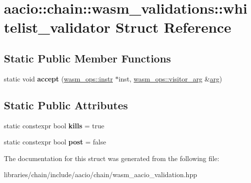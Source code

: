 \hypertarget{structaacio_1_1chain_1_1wasm__validations_1_1whitelist__validator}{}\section{aacio\+:\+:chain\+:\+:wasm\+\_\+validations\+:\+:whitelist\+\_\+validator Struct Reference}
\label{structaacio_1_1chain_1_1wasm__validations_1_1whitelist__validator}
\subsection*{Static Public Member Functions}
\begin{DoxyCompactItemize}
\item 
\mbox{\label{structaacio_1_1chain_1_1wasm__validations_1_1whitelist__validator_a9bad0a2b82ad8829cca69389fc95f2da}} 
static void {\bfseries accept} (\mbox{\hyperlink{structaacio_1_1chain_1_1wasm__ops_1_1instr}{wasm\+\_\+ops\+::instr}} $\ast$inst, \mbox{\hyperlink{structaacio_1_1chain_1_1wasm__ops_1_1visitor__arg}{wasm\+\_\+ops\+::visitor\+\_\+arg}} \&\mbox{\hyperlink{unionarg}{arg}})
\end{DoxyCompactItemize}
\subsection*{Static Public Attributes}
\begin{DoxyCompactItemize}
\item 
\mbox{\label{structaacio_1_1chain_1_1wasm__validations_1_1whitelist__validator_afaee3aa201ab4d0dc11b5eacb3c676ab}} 
static constexpr bool {\bfseries kills} = true
\item 
\mbox{\label{structaacio_1_1chain_1_1wasm__validations_1_1whitelist__validator_a9c8c3f2b59c9762ce7365efe9f55cce2}} 
static constexpr bool {\bfseries post} = false
\end{DoxyCompactItemize}


The documentation for this struct was generated from the following file\+:\begin{DoxyCompactItemize}
\item 
libraries/chain/include/aacio/chain/wasm\+\_\+aacio\+\_\+validation.\+hpp\end{DoxyCompactItemize}

